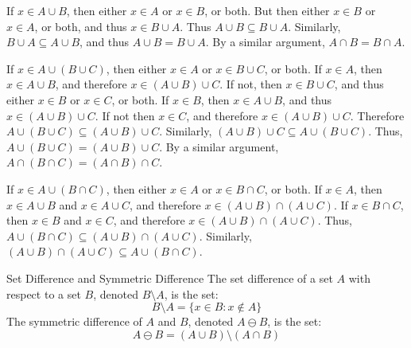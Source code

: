 \documentclass[crop=false,class=book,oneside]{standalone}
\begin{document}
            \begin{bproof}
                If $x\in{A}\cup{B}$, then either $x\in{A}$ or $x\in{B}$,
                or both. But then either $x\in{B}$ or $x\in{A}$, or both,
                and thus $x\in{B}\cup{A}$. Thus $A\cup{B}\subseteq{B}\cup{A}$.
                Similarly, $B\cup{A}\subseteq{A}\cup{B}$, and thus
                $A\cup{B}=B\cup{A}$. By a similar argument,
                $A\cap{B}=B\cap{A}$.
                \par\hfill\par
                If $x\in{A}\cup(B\cup{C})$, then either
                $x\in{A}$ or $x\in{B}\cup{C}$, or both.
                If $x\in{A}$, then $x\in{A}\cup{B}$, and
                therefore $x\in(A\cup{B})\cup{C}$. If not,
                then $x\in{B}\cup{C}$, and thus either
                $x\in{B}$ or $x\in{C}$, or both.
                If $x\in{B}$, then $x\in{A}\cup{B}$, and
                thus $x\in(A\cup{B})\cup{C}$. If not
                then $x\in{C}$, and therefore
                $x\in(A\cup{B})\cup{C}$. Therefore
                $A\cup(B\cup{C})\subseteq(A\cup{B})\cup{C}$.
                Similarly, $(A\cup{B})\cup{C}\subseteq{A}\cup(B\cup{C})$.
                Thus, $A\cup(B\cup{C})=(A\cup{B})\cup{C}$. By a similar
                argument, $A\cap(B\cap{C})=(A\cap{B})\cap{C}$.
                \par\hfill\par
                If $x\in{A}\cup(B\cap{C})$, then either $x\in{A}$
                or $x\in{B}\cap{C}$, or both. If $x\in{A}$, then
                $x\in{A}\cup{B}$ and $x\in{A}\cup{C}$, and therefore
                $x\in(A\cup{B})\cap(A\cup{C})$. If $x\in{B}\cap{C}$,
                then $x\in{B}$ and $x\in{C}$, and therefore
                $x\in(A\cup{B})\cap(A\cup{C})$. Thus,
                $A\cup(B\cap{C})\subseteq(A\cup{B})\cap(A\cup{C})$.
                Similarly,
                $(A\cup{B})\cap(A\cup{C})\subseteq{A}\cup(B\cap{C})$.
            \end{bproof}
            \begin{ldefinition}{Set Difference and Symmetric Difference}
                The set difference of a set $A$ with respect to a set $B$,
                denoted $B\setminus{A}$, is the set:
                \begin{equation}
                    B\setminus{A}=\{x\in{B}:x\notin{A}\}
                \end{equation}
                The symmetric difference of $A$ and $B$, denoted
                $A\ominus{B}$, is the set:
                \begin{equation}
                    A\ominus{B}=(A\cup{B})\setminus(A\cap{B})
                \end{equation}
            \end{ldefinition}
\end{document}
